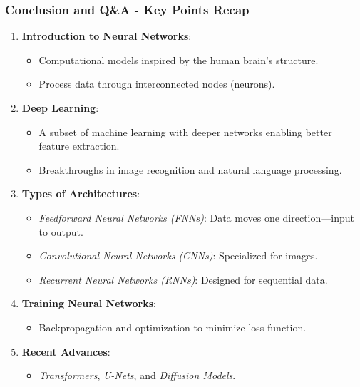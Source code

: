 \documentclass[aspectratio=169]{beamer}
\begin{document}
\begin{frame}[fragile]
    \frametitle{Conclusion and Q\&A - Key Points Recap}
    
    \begin{enumerate}
        \item \textbf{Introduction to Neural Networks}:
        \begin{itemize}
            \item Computational models inspired by the human brain's structure.
            \item Process data through interconnected nodes (neurons).
        \end{itemize}
        
        \item \textbf{Deep Learning}:
        \begin{itemize}
            \item A subset of machine learning with deeper networks enabling better feature extraction.
            \item Breakthroughs in image recognition and natural language processing.
        \end{itemize}
        
        \item \textbf{Types of Architectures}:
        \begin{itemize}
            \item \textit{Feedforward Neural Networks (FNNs)}: Data moves one direction—input to output.
            \item \textit{Convolutional Neural Networks (CNNs)}: Specialized for images.
            \item \textit{Recurrent Neural Networks (RNNs)}: Designed for sequential data.
        \end{itemize}
        
        \item \textbf{Training Neural Networks}:
        \begin{itemize}
            \item Backpropagation and optimization to minimize loss function.
        \end{itemize}

        \item \textbf{Recent Advances}:
        \begin{itemize}
            \item \textit{Transformers}, \textit{U-Nets}, and \textit{Diffusion Models}.
        \end{itemize}
    \end{enumerate}
\end{frame}
\end{document}
